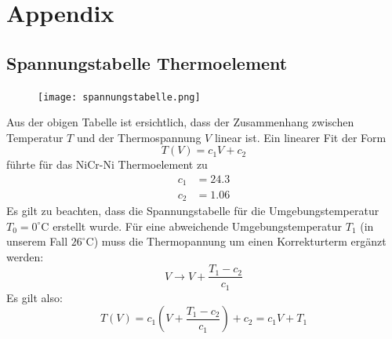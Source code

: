 \documentclass[a4paper,parskip,11pt, DIV12]{scrreprt}
\begin{document}
\clearpage



\chapter{Appendix}
\section{Spannungstabelle Thermoelement}
\label{Kacktabelle}
\begin{figure}[htbp]
\centering
\texttt{[image: spannungstabelle.png]}
\end{figure}
%
Aus der obigen Tabelle ist ersichtlich, dass der Zusammenhang zwischen Temperatur $T$ und der Thermospannung $V$ linear ist. Ein linearer Fit der Form
%
\begin{equation}
T(V) = c_1 V + c_2
\end{equation}
führte für das NiCr-Ni Thermoelement zu
\begin{align*}
c_1 &= 24.3\\
c_2 &= 1.06
\end{align*}
Es gilt zu beachten, dass die Spannungstabelle für die Umgebungstemperatur $T_0 = 0^{\circ}$C erstellt wurde. 
Für eine abweichende Umgebungstemperatur $T_1$ (in unserem Fall $26^{\circ}$C) muss die Thermopannung um einen Korrekturterm ergänzt werden:
%
\begin{equation}
V \rightarrow V + \frac{T_1-c_2}{c_1}
\end{equation}
%
Es gilt also:
\begin{equation}
T(V) = c_1 \left(V+ \frac{T_1-c_2}{c_1}\right)+c_2= c_1 V + T_1
\end{equation}
 
 

\end{document}

